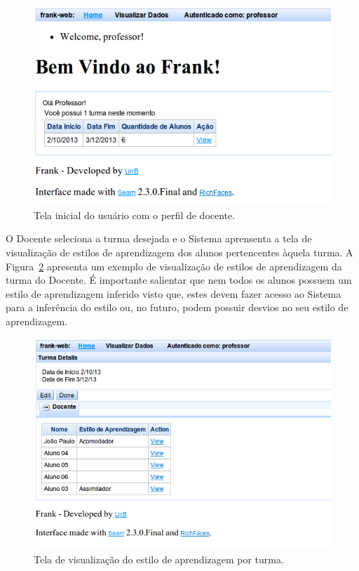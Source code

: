 \begin{figure}
	\centering
	\includegraphics[scale=0.6]{images/frank-tela-professor-acesso.png}
	\caption{Tela inicial do usuário com o perfil de docente.}
	\label{fig:frank-tela-professor-acesso}
\end{figure}

O Docente seleciona a turma desejada e o Sistema aprensenta a tela de visualização de estilos de aprendizagem dos alunos pertencentes àquela turma. A Figura~\ref{fig:frank-tela-professor-visualizar-turma} apresenta um exemplo de visualização de estilos de aprendizagem da turma do Docente. É importante salientar que nem todos os alunos possuem um estilo de aprendizagem inferido visto que, estes devem fazer acesso ao Sistema para a inferência do estilo ou, no futuro, podem possuir desvios no seu estilo de aprendizagem.

\begin{figure}
	\centering
	\includegraphics[scale=0.6]{images/frank-tela-professor-visualizar-turma.png}
	\caption{Tela de visualização do estilo de aprendizagem por turma.}
	\label{fig:frank-tela-professor-visualizar-turma}
\end{figure}

